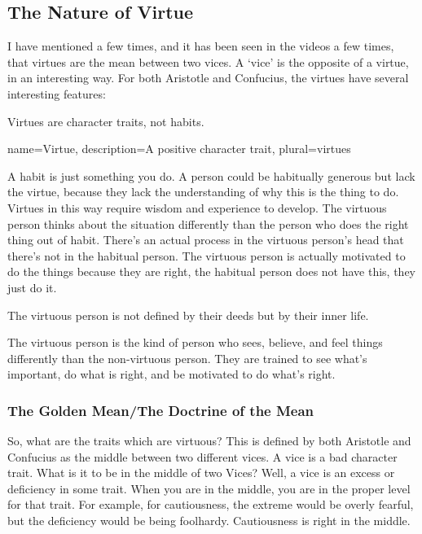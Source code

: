 \subsection{The Nature of Virtue}

I have mentioned a few times, and it has been seen in the videos a few times, that \glspl{virtue} are the mean between two vices. A ‘vice’ is the opposite of a virtue, in an interesting way. For both Aristotle and Confucius, the virtues have several interesting features:
\begin{center}
Virtues are character traits, not habits.
\end{center}

{
  name=Virtue,
  description={A positive character trait},
  plural=virtues
}


A habit is just something you do. A person could be habitually generous but lack the virtue, because they lack the understanding of why this is the thing to do. Virtues in this way require wisdom and experience to develop. The virtuous person thinks about the situation differently than the person who does the right thing out of habit. There’s an actual process in the virtuous person’s head that there’s not in the habitual person. The virtuous person is actually motivated to do the things because they are right, the habitual person does not have this, they just do it.
\begin{center}
The virtuous person is not defined by their deeds but by their inner life.
\end{center}
The virtuous person is the kind of person who sees, believe, and feel things differently than the non-virtuous person. They are trained to see what’s important, do what is right, and be motivated to do what’s right.

\subsubsection{The Golden Mean/The Doctrine of the Mean}

So, what are the traits which are virtuous? This is defined by both Aristotle and Confucius as the middle between two different vices. A vice is a bad character trait. What is it to be in the middle of two \glspl{Vice}?  Well, a vice is an excess or deficiency in some trait. When you are in the middle, you are in the proper level for that trait. For example, for cautiousness, the extreme would be overly fearful, but the deficiency would be being foolhardy. Cautiousness is right in the middle. 

